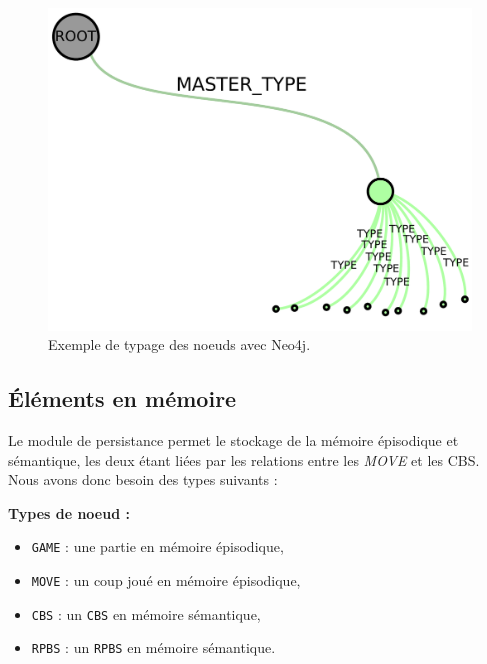 \begin{figure}[H]
\includegraphics[width=\textwidth]{files/neo4j/example_node_type}
\caption{Exemple de typage des noeuds avec Neo4j.}
\label{example_node_type}
\end{figure}

\subsection{Éléments en mémoire}

Le module de persistance permet le stockage de la mémoire épisodique et sémantique, les deux étant liées par les relations entre les \emph{MOVE} et les \gls{CBS}. Nous avons donc besoin des types suivants : 

\textbf{Types de noeud :}
\begin{itemize}
	\item \texttt{GAME} : une partie en mémoire épisodique, 
	\item \texttt{MOVE} : un coup joué en mémoire épisodique,
	\item \texttt{\gls{CBS}} : un \texttt{\gls{CBS}} en mémoire sémantique,
	\item \texttt{\gls{RPBS}} : un \texttt{\gls{RPBS}} en mémoire sémantique.
\end{itemize}


